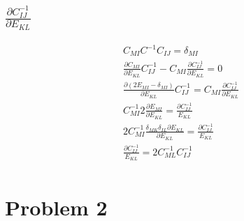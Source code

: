 \documentclass[10pt,a4paper]{article}
\begin{document}
  
   \subsection{$\frac{\partial C^{-1}_{IJ}}{\partial E_{KL}}$}
   \begin{equation}
   \begin{split}
   C_{MI}C^{-1}C_{IJ} = \delta_{MI}\\
	\frac{\partial C_{MI}}{\partial E_{KL}} C^{-1}_{IJ} - C_{MI}\frac{\partial C^{-1}_{IJ}}{\partial E_{KL}} = 0\\
	\frac{\partial(2E_{MI}-\delta_{MI})}{\partial E_{KL}}C^{-1}_{IJ} = C_{MI}\frac{\partial C^{-1}_{IJ}}{\partial E_{KL}}\\
	C^{-1}_{MI}2\frac{\partial E_{MI}}{\partial E_{KL}} = \frac{\partial C^{-1}_{IJ}}{E_{KL}}\\
	2C^{-1}_{MI}\frac{ \delta_{MK} \delta_{IL} \partial E_{KL}}{\partial E_{KL}} = \frac{\partial C^{-1}_{IJ}}{E_{KL}}\\
	 \frac{\partial C^{-1}_{IJ}}{E_{KL}} = 2C^{-1}_{ML}C^{-1}_{IJ}\\
	\end{split}
   \end{equation}












\section{Problem 2}
\end{document}

